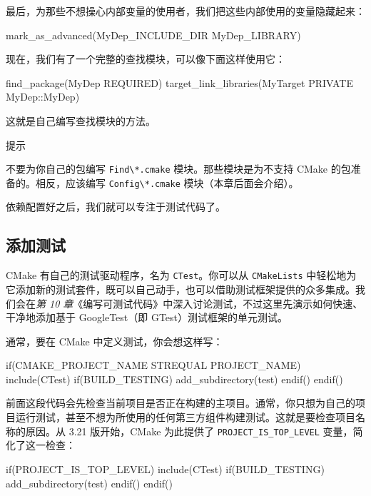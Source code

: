 最后，为那些不想操心内部变量的使用者，我们把这些内部使用的变量隐藏起来：

\begin{codebox}[text]
mark_as_advanced(MyDep_INCLUDE_DIR MyDep_LIBRARY)
\end{codebox}

现在，我们有了一个完整的查找模块，可以像下面这样使用它：

\begin{codebox}[cmake]
find_package(MyDep REQUIRED)
target_link_libraries(MyTarget PRIVATE MyDep::MyDep)
\end{codebox}

这就是自己编写查找模块的方法。

\begin{myTip}{提示}

不要为你自己的包编写 \texttt{Find\textbackslash{}*.\allowbreak{}cmake} 模块。那些模块是为不支持 CMake 的包准备的。相反，应该编写 \texttt{Config\textbackslash{}*.\allowbreak{}cmake} 模块（本章后面会介绍）。
\end{myTip}

\label{idx:692}
\label{idx:693}
依赖配置好之后，我们就可以专注于测试代码了。

\subsection{添加测试}

\label{idx:694}
CMake 有自己的测试驱动程序，名为 \texttt{CTest}。你可以从 \texttt{CMake\allowbreak{}Lists} 中轻松地为它添加新的测试套件，既可以自己动手，也可以借助测试框架提供的众多集成。我们会在\emph{第 10 章}《编写可测试代码》中深入讨论测试，不过这里先演示如何快速、干净地添加基于 GoogleTest（即 GTest）测试框架的单元测试。

通常，要在 CMake 中定义测试，你会想这样写：

\begin{codebox}[cmake]
if(CMAKE_PROJECT_NAME STREQUAL PROJECT_NAME)
  include(CTest)
  if(BUILD_TESTING)
    add_subdirectory(test)
  endif()
endif()
\end{codebox}

前面这段代码会先检查当前项目是否正在构建的主项目。通常，你只想为自己的项目运行测试，甚至不想为所使用的任何第三方组件构建测试。这就是要检查项目名称的原因。从 3.21 版开始，CMake 为此提供了 \texttt{PROJECT\_\allowbreak{}IS\_\allowbreak{}TOP\_\allowbreak{}LEVEL} 变量，简化了这一检查：

\begin{codebox}[cmake]
if(PROJECT_IS_TOP_LEVEL)
  include(CTest)
  if(BUILD_TESTING)
    add_subdirectory(test)
  endif()
endif()
\end{codebox}

